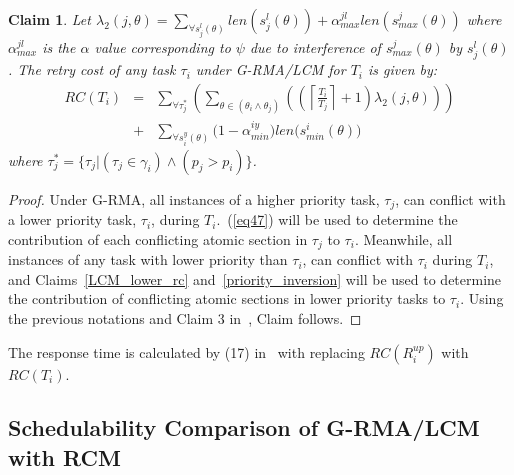 \documentclass[conference]{IEEEtran}
\newtheorem{clm}{Claim}
\begin{document}
\begin{clm}\label{response g-rma/lcm}
Let $\lambda_{2}(j,\theta)=\sum_{\forall s_{j}^{l}(\theta)}len(s_{j}^{l}(\theta))+\alpha_{max}^{jl}len(s_{max}^{j}(\theta))$ where $\alpha_{max}^{jl}$ is the $\alpha$ value corresponding to $\psi$ due to interference of $s_{max}^j(\theta)$ by $s_j^l(\theta)$. The retry cost of any task $\tau_i$ under G-RMA/LCM for $T_i$ is given by:
\begin{eqnarray}
RC\left(T_i\right) & = &
  \sum_{\forall \tau_{j}^{*}}\left(\sum_{\theta\in(\theta_{i}\wedge\theta_{j})}\left(\left(\left\lceil\frac{T_i}{T_{j}}\right\rceil +1\right)\lambda_{2}(j,\theta)\right)\right)\nonumber\\
& + & \sum_{\forall s_{i}^{y}(\theta)}\Big(1-\alpha_{min}^{iy}\Big)len\Big(s_{min}^i(\theta)\Big)
\label{eq60}
\end{eqnarray}
where $\tau_{j}^{*}=\{\tau_{j}|(\tau_{j}\in\gamma_{i})\wedge(p_{j}>p_{i})\}$.
\end{clm}
\begin{proof}
Under G-RMA, all instances of a higher priority task, $\tau_{j}$, can conflict with a lower priority task,
$\tau_{i}$, during $T_{i}$.~(\ref{eq47}) will be used to determine the contribution of each conflicting atomic section in $\tau_j$ to $\tau_i$. Meanwhile, all instances of any task with lower priority than $\tau_{i}$, can conflict with $\tau_i$ during $T_{i}$, and Claims~\ref{LCM_lower_rc} and~\ref{priority_inversion} will be used to determine the contribution of conflicting atomic sections in lower priority tasks to $\tau_i$.
%
Using the previous notations and Claim 3 in~\cite{stmconcurrencycontrol:emsoft11}, Claim follows.
\end{proof}

The response time is calculated by (17) in~\cite{stmconcurrencycontrol:emsoft11} with replacing $RC(R_i^{up})$ with $RC(T_i)$.

\subsection{Schedulability Comparison of G-RMA/LCM with RCM}
\label{rma eval}
\end{document}
